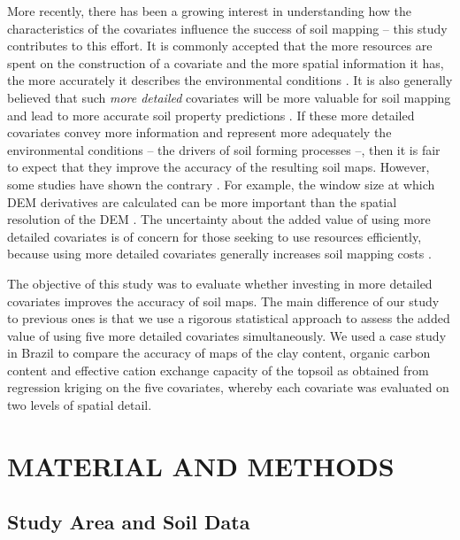More recently, there has been a growing interest in understanding how the characteristics of the covariates 
influence the success of soil mapping -- this study contributes to this effort. It is commonly accepted that 
the more resources are spent on the construction of a covariate and the more spatial information it has, the 
more accurately it describes the environmental conditions \cite{HupyEtAl2004, HenglEtAl2013a}. It is also 
generally believed that such \emph{more detailed} covariates will be more valuable for soil mapping and lead to 
more accurate soil property predictions \cite{CavazziEtAl2013, MaynardEtAl2014}. If these more detailed 
covariates convey more information and represent more adequately the environmental conditions -- the drivers of 
soil forming processes --, then it is fair to expect that they improve the accuracy of the resulting soil maps. 
However, some studies have shown the contrary \cite{ThompsonEtAl2001, EldeiryEtAl2008, KimEtAl2014}. For 
example, the window size at which DEM derivatives are calculated can be more important than the spatial 
resolution of the DEM \cite{Wood1996, ZhuEtAl2008, BehrensEtAl2010a}. The uncertainty about the added value of 
using more detailed covariates is of concern for those seeking to use resources efficiently, because using more 
detailed covariates generally increases soil mapping costs \cite{ShiEtAl2012}.

The objective of this study was to evaluate whether investing in more detailed covariates improves the accuracy 
of soil maps. The main difference of our study to previous ones is that we use a rigorous statistical approach 
to assess the added value of using five more detailed covariates simultaneously. We used a case study in Brazil 
to compare the accuracy of maps of the clay content, organic carbon content and effective cation exchange 
capacity of the topsoil as obtained from regression kriging on the five covariates, whereby each covariate was 
evaluated on two levels of spatial detail.

\section{MATERIAL AND METHODS}
\label{sec:chap05-methods}

\subsection{Study Area and Soil Data}
\label{subsec:chap05-soil-data}

